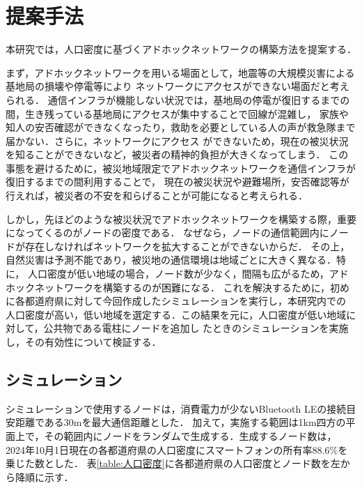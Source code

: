 \documentclass[a4paper, 11pt]{ltjsarticle}
\begin{document}

\clearpage
\section{提案手法} \label{提案手法}
本研究では，人口密度に基づくアドホックネットワークの構築方法を提案する．

まず，アドホックネットワークを用いる場面として，地震等の大規模災害による基地局の損壊や停電等により
ネットワークにアクセスができない場面だと考えられる．
通信インフラが機能しない状況では，基地局の停電が復旧するまでの間，生き残っている基地局にアクセスが集中することで回線が混雑し，
家族や知人の安否確認ができなくなったり，救助を必要としている人の声が救急隊まで届かない．さらに，ネットワークにアクセス
ができないため，現在の被災状況を知ることができないなど，被災者の精神的負担が大きくなってしまう．
この事態を避けるために，被災地域限定でアドホックネットワークを通信インフラが復旧するまでの間利用することで，
現在の被災状況や避難場所，安否確認等が行えれば，被災者の不安を和らげることが可能になると考えられる．

しかし，先ほどのような被災状況でアドホックネットワークを構築する際，重要になってくるのがノードの密度である．
なぜなら，ノードの通信範囲内にノードが存在しなければネットワークを拡大することができないからだ．
その上，自然災害は予測不能であり，被災地の通信環境は地域ごとに大きく異なる．特に，
人口密度が低い地域の場合，ノード数が少なく，間隔も広がるため，アドホックネットワークを構築するのが困難になる．
これを解決するために，初めに各都道府県に対して今回作成したシミュレーションを実行し，本研究内での
人口密度が高い，低い地域を選定する．この結果を元に，人口密度が低い地域に対して，公共物である電柱にノードを追加し
たときのシミュレーションを実施し，その有効性について検証する．

\subsection{シミュレーション}
シミュレーションで使用するノードは，消費電力が少ないBluetooth LEの接続目安距離である30mを最大通信距離とした．
加えて，実施する範囲は1km四方の平面上で，その範囲内にノードをランダムで生成する．生成するノード数は，
2024年10月1日現在の各都道府県の人口密度\cite{人口密度}にスマートフォンの所有率88.6\%を乗じた数とした．
表\ref{table:人口密度}に各都道府県の人口密度とノード数を左から降順に示す．
\end{document}
